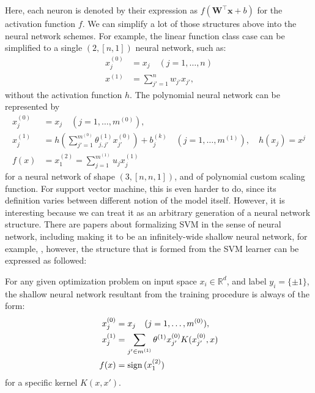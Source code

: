 \documentclass[10pt]{article} %
\begin{document}
Here, each neuron is denoted by their expression as $f(\mathbf{W}^{\top}\mathbf{x}+b)$ for the activation function $f$. We can simplify a lot of those structures above into the neural network schemes. For example, the linear function class case can be simplified to a single $(2,[n,1])$ neural network, such as: 
\begin{align}
    x^{(0)}_{j} &= x_{j} \quad (j=1,\dots,n)\\
    x^{(1)} &= \sum_{j'=1}^{n} w_{j'}x_{j'}, 
\end{align}
without the activation function $h$. The polynomial neural network can be represented by 
\begin{align}
    x_{j}^{(0)} &= x_{j} \quad (j=1,\dots,m^{(0)}),\\ 
    x_{j}^{(1)} &= h\left(\sum^{m^{(0)}}_{j'=1} \theta_{j,j'}^{(1)}x_{j'}^{(0)} \right)+b_{j}^{(k)}\quad (j=1,\dots,m^{(1)}),\quad h(x_{j})=x^{j}\\
    f(x) & = x_{1}^{(2)} = \sum^{m^{(1)}}_{j=1} u_{j}x_{j}^{(1)}
\end{align}
for a neural network of shape $(3,[n,n,1])$, and of polynomial custom scaling function. For support vector machine, this is even harder to do, since its definition varies between different notion of the model itself. However, it is interesting because we can treat it as an arbitrary generation of a neural network structure. There are papers about formalizing SVM in the sense of neural network, including making it to be an infinitely-wide shallow neural network, for example, \cite{chen2021equivalence,wang2019svmdsn,zhang2014equivalence}, however, the structure that is formed from the SVM learner can be expressed as followed:
\begin{definition}
    For any given optimization problem on input space $x_{i}\in \mathbb{R}^{d}$, and label $y_{i}=\{\pm 1\}$, the shallow neural network resultant from the training procedure is always of the form:
    \begin{align}
        x_{j}^{(0)} &= x_{j} \quad (j=1,\dots,m^{(0)}),\\ 
        x_{j}^{(1)} &= \sum_{j'\in m^{(1)}} \theta^{(1)}x_{j'}^{(0)}K(x_{j'}^{(0)},x)\\
        f(x) & = \operatorname{sign}{(x_{1}^{(2)}) }
    \end{align}
    for a specific kernel $K(x,x')$. 
\end{definition}
\end{document}
